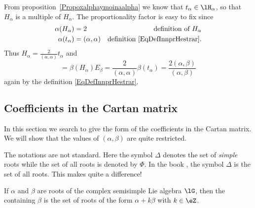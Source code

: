 From proposition~\ref{Propoxalphaymoinaalpha} we know that \( t_{\alpha}\in\lH_{\alpha}\), so that \( H_{\alpha}\) is a multiple of \( H_{\alpha}\). The proportionality factor is easy to fix since
\begin{equation}        \label{EqRealsHalpatalphaNorsmd}
	\begin{aligned}[]
		\alpha(H_{\alpha}) & =2               & \text{definition of }H_{\alpha}              \\
		\alpha(t_{\alpha}) & =(\alpha,\alpha) & \text{definition \eqref{EqDefInnprHestrar}}.
	\end{aligned}
\end{equation}
Thus \( H_{\alpha}=\frac{ 2 }{ (\alpha,\alpha) }t_{\alpha}\) and
\begin{equation}
	[H_{\alpha},E_{\beta}]=\beta(H_{\alpha})E_{\beta}=\frac{ 2 }{ (\alpha,\alpha) }\beta(t_{\alpha})=\frac{ 2(\alpha,\beta) }{ (\alpha,\beta) }
\end{equation}
again by the definition \eqref{EqDefInnprHestrar}.

\subsection{Coefficients in the Cartan matrix}

In this section we search to give the form of the coefficients in the Cartan matrix. We will show that the values of \( (\alpha,\beta)\) are quite restricted.

\begin{remark}
	The notations are not standard. Here the symbol \( \Delta\) denotes the set of \emph{simple} roots while the set of all roots is denoted by \( \Phi\). In the book \cite{Cornwell}, the symbol \( \Delta\) is the set of all roots. This makes quite a difference!
\end{remark}

\begin{definition}
	If \( \alpha\) and \( \beta\) are roots of the complex semisimple Lie algebra \( \lG\), then the  containing \( \beta\) is the set of roots of the form \( \alpha+k\beta\) with \( k\in\eZ\).
\end{definition}

